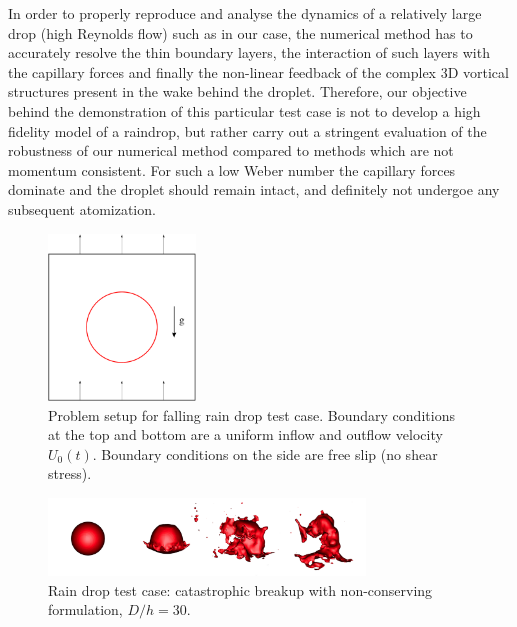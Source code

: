 In order to properly reproduce and analyse the dynamics of a relatively large drop (high Reynolds flow) such as in our case, the numerical method has to accurately resolve the thin boundary layers, the interaction of such layers with the capillary forces and finally the non-linear feedback of the complex 3D vortical structures present in the wake behind the droplet. Therefore, our objective behind the demonstration of this particular test case is not to develop a high fidelity model of a raindrop, but rather carry out a stringent evaluation of the robustness of our numerical method compared to methods which are not momentum consistent. For such a low Weber number the capillary forces dominate and the droplet should remain intact, and definitely not undergoe any subsequent atomization. 


\begin{figure}[h!]
\begin{center}
\includegraphics[width=0.35\textwidth]{Figures/setup.pdf}
\end{center}
\caption{Problem setup for falling rain drop test case. Boundary conditions 
at the top and bottom are a uniform inflow and outflow velocity $U_0(t)$. 
Boundary conditions on the side are free slip (no shear stress).}
\label{setup}
\end{figure}


\begin{figure}
\begin{center}
\includegraphics[width=0.75\textwidth]{Figures/cata.png}
\end{center}
\caption{Rain drop test case: catastrophic breakup with non-conserving 
formulation, $D/h=30$.}
\label{cata}
\end{figure}

